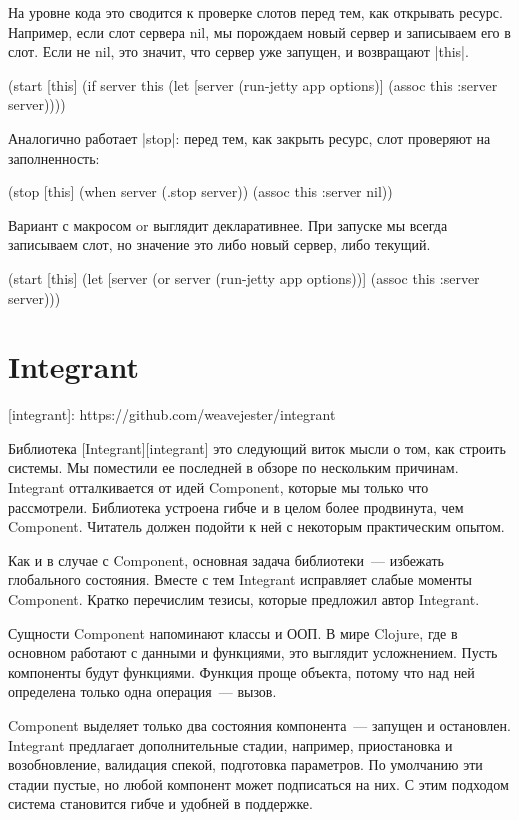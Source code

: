 На уровне кода это сводится к проверке слотов перед тем, как открывать
ресурс. Например, если слот сервера nil, мы порождаем новый сервер и записываем
его в слот. Если не nil, это значит, что сервер уже запущен, и возвращают
\spverb|this|.

\begin{code}
(start [this]
  (if server
    this
    (let [server (run-jetty app options)]
      (assoc this :server server))))
\end{code}

Аналогично работает \spverb|stop|: перед тем, как закрыть ресурс, слот проверяют на
заполненность:

\begin{code}
(stop [this]
  (when server
    (.stop server))
  (assoc this :server nil))
\end{code}

Вариант с макросом or выглядит декларативнее. При запуске мы всегда записываем
слот, но значение это либо новый сервер, либо текущий.

\begin{code}
(start [this]
  (let [server (or server (run-jetty app options))]
    (assoc this :server server)))
\end{code}

\section{Integrant}

[integrant]: https://github.com/weavejester/integrant

Библиотека [Integrant][integrant] это следующий виток мысли о том, как строить
системы. Мы поместили ее последней в обзоре по нескольким причинам. Integrant
отталкивается от идей Component, которые мы только что рассмотрели. Библиотека
устроена гибче и в целом более продвинута, чем Component. Читатель должен
подойти к ней с некоторым практическим опытом.

Как и в случае с Component, основная задача библиотеки~--- избежать глобального
состояния. Вместе с тем Integrant исправляет слабые моменты Component. Кратко
перечислим тезисы, которые предложил автор Integrant.

Сущности Component напоминают классы и ООП. В мире Clojure, где в основном
работают с данными и функциями, это выглядит усложнением. Пусть компоненты будут
функциями. Функция проще объекта, потому что над ней определена только одна
операция~--- вызов.

Component выделяет только два состояния компонента~--- запущен и
остановлен. Integrant предлагает дополнительные стадии, например, приостановка и
возобновление, валидация спекой, подготовка параметров. По умолчанию эти стадии
пустые, но любой компонент может подписаться на них. С этим подходом система
становится гибче и удобней в поддержке.

